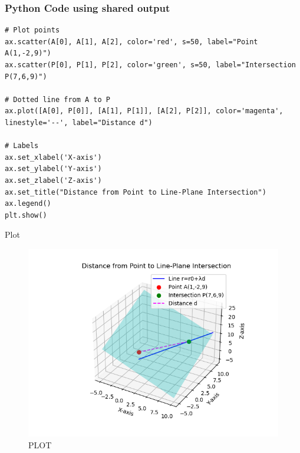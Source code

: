 \documentclass{beamer}
\begin{document}
\begin{frame}[fragile]
			\frametitle{Python Code using shared output}
			\begin{lstlisting}
# Plot points
ax.scatter(A[0], A[1], A[2], color='red', s=50, label="Point A(1,-2,9)")
ax.scatter(P[0], P[1], P[2], color='green', s=50, label="Intersection P(7,6,9)")

# Dotted line from A to P
ax.plot([A[0], P[0]], [A[1], P[1]], [A[2], P[2]], color='magenta', linestyle='--', label="Distance d")

# Labels
ax.set_xlabel('X-axis')
ax.set_ylabel('Y-axis')
ax.set_zlabel('Z-axis')
ax.set_title("Distance from Point to Line-Plane Intersection")
ax.legend()
plt.show()

			\end{lstlisting}
			
		\end{frame}
		
		\begin{frame}{Plot}
		    \begin{figure}[H]
    \centering
    \includegraphics[width=0.7\columnwidth]{figs/Figure_1.png}
    \caption{PLOT}
    \label{fig:fig1}
\end{figure}
		\end{frame}
		
	
\end{document}
